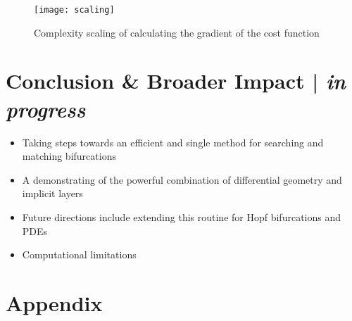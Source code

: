 \begin{figure}
\centering
\texttt{[image: scaling]}
\caption{Complexity scaling of calculating the gradient of the cost function}
\label{fig:scaling}
\end{figure}
 
\section{Conclusion \& Broader Impact | \textit{in progress}}
\begin{itemize}
    \item Taking steps towards an efficient and single method for searching and matching bifurcations
    \item A demonstrating of the powerful combination of differential geometry and implicit layers
    \item Future directions include extending this routine for Hopf bifurcations and PDEs
    \item Computational limitations
\end{itemize}

% 




\section*{Appendix}
\appendix



